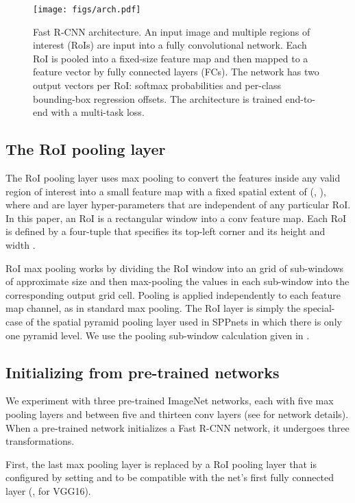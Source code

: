 \documentclass[10pt,twocolumn,letterpaper]{article}
\newcommand{\vggsixteen}{VGG16\xspace}
\newcommand{\roi}{RoI\xspace}
\begin{document}
\begin{figure}[t!]
\centering
\texttt{[image: figs/arch.pdf]}
\caption{Fast R-CNN architecture. An input image and multiple regions of interest ({\roi}s) are input into a fully convolutional network. Each \roi is pooled into a fixed-size feature map and then mapped to a feature vector by fully connected layers (FCs). The network has two output vectors per \roi: softmax probabilities and per-class bounding-box regression offsets. The architecture is trained end-to-end with a multi-task loss.}
\end{figure}


\subsection{The \roi pooling layer}
The \roi pooling layer uses max pooling to convert the features inside any valid region of interest into a small feature map with a fixed spatial extent of  (\eg, ), where  and  are layer hyper-parameters that are independent of any particular \roi.
In this paper, an \roi is a rectangular window into a conv feature map.
Each \roi is defined by a four-tuple  that specifies its top-left corner  and its height and width .

\roi max pooling works by dividing the  RoI window into an  grid of sub-windows of approximate size  and then max-pooling the values in each sub-window into the corresponding output grid cell.
Pooling is applied independently to each feature map channel, as in standard max pooling.
The \roi layer is simply the special-case of the spatial pyramid pooling layer used in SPPnets \cite{he2014spp} in which there is only one pyramid level.
We use the pooling sub-window calculation given in \cite{he2014spp}.




\subsection{Initializing from pre-trained networks}
We experiment with three pre-trained ImageNet \cite{imagenet_cvpr09} networks, each with five max pooling layers and between five and thirteen conv layers (see  for network details).
When a pre-trained network initializes a Fast R-CNN network, it undergoes three transformations.

First, the last max pooling layer is replaced by a \roi pooling layer that is configured by setting  and  to be compatible with the net's first fully connected layer (\eg,  for \vggsixteen).
\end{document}
